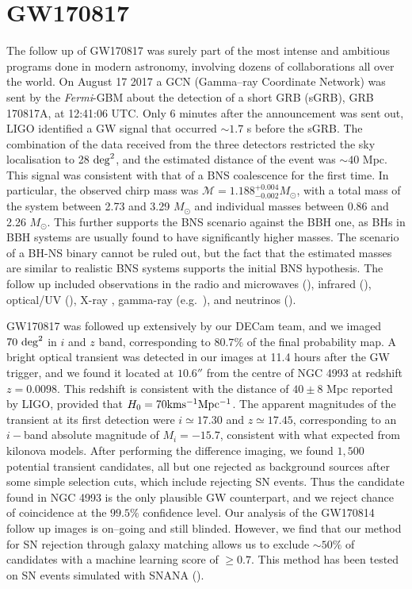 \section{GW170817}
The follow up of GW170817 was surely part of the most intense and ambitious programs done in modern astronomy, involving dozens of collaborations all over the world.
On August 17 2017 a GCN (Gamma--ray Coordinate Network) was sent by the \emph{Fermi}-GBM about the detection of a short GRB (sGRB), GRB 170817A, at 12:41:06 UTC. Only 6 minutes after the announcement was sent out, LIGO identified a GW signal that occurred $\sim 1.7$ s before the sGRB. The combination of the data received from the three detectors restricted the sky localisation to 28 ${\rm deg}^2$, and the estimated distance of the event was $\sim 40$ Mpc.
This signal was consistent with that of a BNS coalescence for the first time. In particular, the observed chirp mass was $\mathcal{M}=1.188^{+0.004}_{-0.002} M_\odot$, with a total mass of the system between 2.73 and 3.29 $M_\odot$ and individual masses between 0.86 and 2.26 $M_\odot$. This further supports the BNS scenario against the BBH one, as BHs in BBH systems are usually found to have significantly higher masses. The scenario of a BH-NS binary cannot be ruled out, but the fact that the estimated masses are similar to realistic BNS systems supports the initial BNS hypothesis. 
The follow up included observations in the radio and microwaves (\citealt{Hallinan+17,Alexander+17}), infrared (\citealt{Chornock+17,Kasliwal+17}), optical/UV (\citealt{Arcavi+17,Cowperthwaite,Evans+17,Kilpatrick+17,Lipunov+17,McCully+17,Pian+17,Smartt+17,Shappee+17,marcelle17,Tanvir+17}), X-ray \citep{Troja+17,Margutti+17,Haggard+17,Fong+17},  gamma-ray (e.g.~\citealt{Goldstein+17,Savchenko+17,LIGO+Fermi}), and neutrinos (\citealt{NEUTRINOS}).

GW170817 was followed up extensively by our DECam team, and we imaged $70~{\rm deg}^2$ in $i$ and $z$ band, corresponding to $80.7\%$ of the final probability map. A bright optical transient was detected in our images at 11.4 hours after the GW trigger, and we found it located at $10.6''$ from the centre of NGC 4993 at redshift $z = 0.0098$. This redshift is consistent with the distance of $40\pm8$ Mpc reported by LIGO, provided that $H_0 = 70 {\rm km s^{-1} Mpc^{-1}}$. The apparent magnitudes of the transient at its first detection were $i\simeq 17.30$ and $z\simeq 17.45$, corresponding to an $i-$band absolute magnitude of $M_i=-15.7$, consistent with what expected from kilonova models. After performing the difference imaging, we found $1,500$ potential transient candidates, all but one rejected as background sources after some simple selection cuts, which include rejecting SN events. Thus the candidate found in NGC 4993 is the only plausible GW counterpart, and we reject chance of coincidence at the $99.5\%$ confidence level. Our analysis of the GW170814 follow up images is on--going and still blinded. However, we find that our method for SN rejection through galaxy matching allows us to exclude $\sim 50\%$ of candidates with a machine learning score of $\geq 0.7$. This method has been tested on SN events simulated with \textsc{SNANA} (\citealt{snana}).


